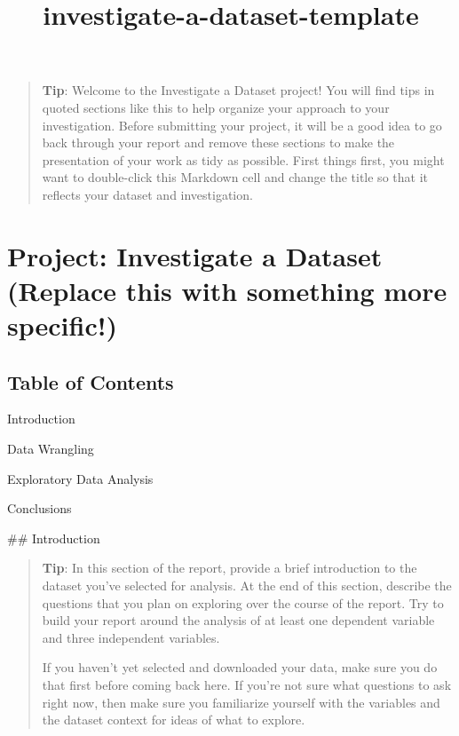 \documentclass[11pt]{article}
\title{investigate-a-dataset-template}
\begin{document}
    
    
    \maketitle
    
    

    
    \begin{quote}
\textbf{Tip}: Welcome to the Investigate a Dataset project! You will
find tips in quoted sections like this to help organize your approach to
your investigation. Before submitting your project, it will be a good
idea to go back through your report and remove these sections to make
the presentation of your work as tidy as possible. First things first,
you might want to double-click this Markdown cell and change the title
so that it reflects your dataset and investigation.
\end{quote}

\section{Project: Investigate a Dataset (Replace this with something
more
specific!)}\label{project-investigate-a-dataset-replace-this-with-something-more-specific}

\subsection{Table of Contents}\label{table-of-contents}

Introduction

Data Wrangling

Exploratory Data Analysis

Conclusions

     \#\# Introduction

\begin{quote}
\textbf{Tip}: In this section of the report, provide a brief
introduction to the dataset you've selected for analysis. At the end of
this section, describe the questions that you plan on exploring over the
course of the report. Try to build your report around the analysis of at
least one dependent variable and three independent variables.

If you haven't yet selected and downloaded your data, make sure you do
that first before coming back here. If you're not sure what questions to
ask right now, then make sure you familiarize yourself with the
variables and the dataset context for ideas of what to explore.
\end{quote}
\end{document}
